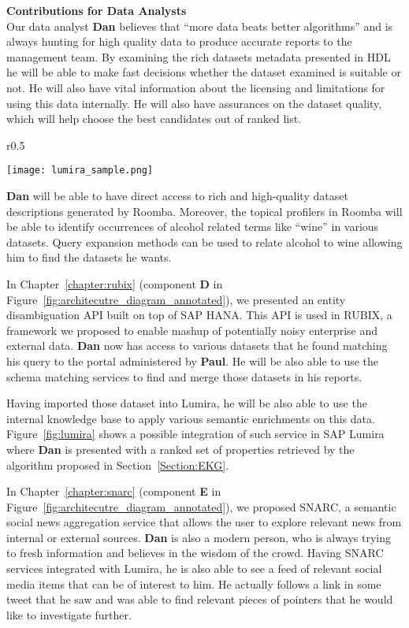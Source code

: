 \textbf{Contributions for Data Analysts}
\vspace{1mm}\\

Our data analyst \textbf{Dan} believes that ``more data beats better algorithms'' and is always hunting for high quality data to produce accurate reports to the management team. By examining the rich datasets metadata presented in HDL he will be able to make fast decisions whether the dataset examined is suitable or not. He will also have vital information about the licensing and limitations for using this data internally. He will also have assurances on the dataset quality, which will help choose the best candidates out of ranked list.

\begin{wrapfigure}{r}{0.5\textwidth}
  \begin{center}
    \texttt{[image: lumira\_sample.png]}
  \end{center}
  \caption{UI Prototype of semantic data enrichment in SAP Lumira}
  \label{fig:lumira}
\end{wrapfigure}

\textbf{Dan} will be able to have direct access to rich and high-quality dataset descriptions generated by Roomba. Moreover, the topical profilers in Roomba will be able to identify occurrences of alcohol related terms like ``wine'' in various datasets. Query expansion methods can be used to relate alcohol to wine allowing him to find the datasets he wants.

In Chapter~\ref{chapter:rubix} (component \textbf{D} in Figure~\ref{fig:architecutre_diagram_annotated}), we presented an entity disambiguation API built on top of SAP HANA. This API is used in RUBIX, a framework we proposed to enable mashup of potentially noisy enterprise and external data.
\textbf{Dan} now has access to various datasets that he found matching his query to the portal administered by \textbf{Paul}. He will be also able to use the schema matching services to find and merge those datasets in his reports.

Having imported those dataset into Lumira, he will be also able to use the internal knowledge base to apply various semantic enrichments on this data. Figure~\ref{fig:lumira} shows a possible integration of such service in SAP Lumira where \textbf{Dan} is presented with a ranked set of properties retrieved by the algorithm proposed in Section~\ref{Section:EKG}.

In Chapter~\ref{chapter:snarc} (component \textbf{E} in Figure~\ref{fig:architecutre_diagram_annotated}), we proposed SNARC, a semantic social news aggregation service that allows the user to explore relevant news from internal or external sources. \textbf{Dan} is also a modern person, who is always trying to fresh information and believes in the wisdom of the crowd. Having SNARC services integrated with Lumira, he is also able to see a feed of relevant social media items that can be of interest to him. He actually follows a link in some tweet that he saw and was able to find relevant pieces of pointers that he would like to investigate further.


